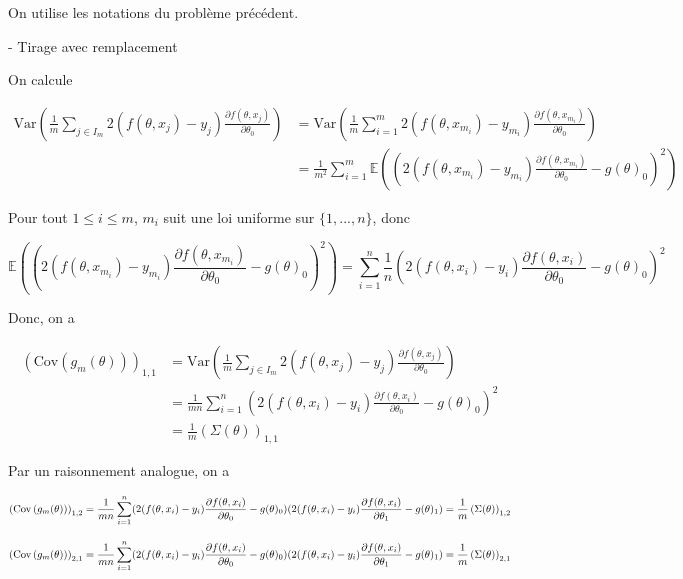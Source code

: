 \documentclass[a4paper,12pt]{article}
\begin{document}
On utilise les notations du problème précédent.

- Tirage avec remplacement

On calcule

\begin{align*}
	\text{Var}\left(\frac{1}{m} \sum_{j \in I_m} 2(f(\theta, x_j) - y_j) \frac{\partial f(\theta, x_j)}{\partial \theta_0}\right) &= \text{Var}\left(\frac{1}{m} \sum_{i = 1}^{m} 2(f(\theta, x_{m_i}) - y_{m_i}) \frac{\partial f(\theta, x_{m_i})}{\partial \theta_0}\right) \\
	&= \frac{1}{m^2} \sum_{i = 1}^{m} \mathbb{E}\left((2(f(\theta, x_{m_i}) - y_{m_i}) \frac{\partial f(\theta, x_{m_i})}{\partial \theta_0} - g(\theta)_0)^2\right)
\end{align*}


Pour tout $1 \le i \le m$, $m_i$ suit une loi uniforme sur $\{1, ..., n\}$, donc

$$ \mathbb E ((2(f(\theta, x_{m_i}) - y_{m_i}) \frac{\partial f(\theta, x_{m_i})}{\partial \theta_0} - g(\theta)_0)^2) = \sum^{n}_{i = 1} \frac{1}{n} (2(f(\theta, x_i) - y_i) \frac{\partial f(\theta, x_i)}{\partial \theta_0} - g(\theta)_0)^2 $$

Donc, on a

\begin{align*}
	\left(\text{Cov}\left(g_{m}(\theta)\right)\right)_{1, 1} &= \text{Var}\left(\frac{1}{m} \sum_{j \in I_m} 2(f(\theta, x_j) - y_j) \frac{\partial f(\theta, x_j)}{\partial \theta_0}\right) \\
	&= \frac{1}{mn} \sum^{n}_{i = 1} (2(f(\theta, x_i) - y_i) \frac{\partial f(\theta, x_i)}{\partial \theta_0} - g(\theta)_0)^2 \\
	&= \frac{1}{m} \left(\Sigma(\theta)\right)_{1, 1}
\end{align*}


Par un raisonnement analogue, on a

$$ \left({\rm Cov} \left( g_{m}(\theta) \right)\right)_{1, 2} = \frac{1}{mn} \sum^{n}_{i = 1} (2(f(\theta, x_i) - y_i) \frac{\partial f(\theta, x_i)}{\partial \theta_0} - g(\theta)_0) (2(f(\theta, x_i) - y_i) \frac{\partial f(\theta, x_i)}{\partial \theta_1} - g(\theta)_1) = \frac{1}{m} \left( \Sigma(\theta) \right)_{1, 2} $$

$$ \left({\rm Cov} \left( g_{m}(\theta) \right)\right)_{2, 1} = \frac{1}{mn} \sum^{n}_{i = 1} (2(f(\theta, x_i) - y_i) \frac{\partial f(\theta, x_i)}{\partial \theta_0} - g(\theta)_0) (2(f(\theta, x_i) - y_i) \frac{\partial f(\theta, x_i)}{\partial \theta_1} - g(\theta)_1) = \frac{1}{m} \left( \Sigma(\theta) \right)_{2, 1} $$
\end{document}
